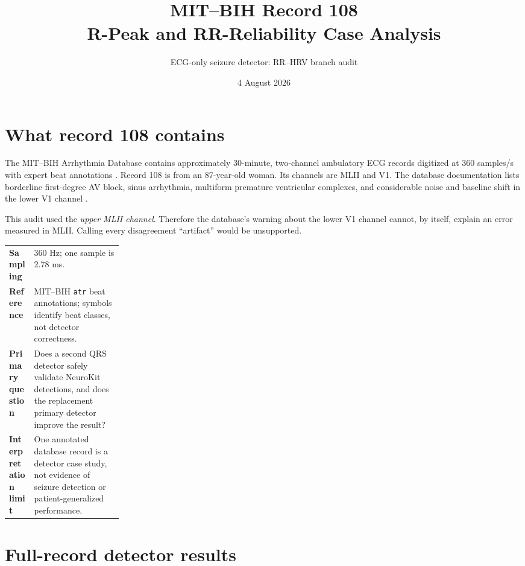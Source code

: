 \documentclass[10pt]{article}
\title{MIT--BIH Record 108\\R-Peak and RR-Reliability Case Analysis}
\author{ECG-only seizure detector: RR--HRV branch audit}
\date{4 August 2026}
\begin{document}
\maketitle


\section{What record 108 contains}
The MIT--BIH Arrhythmia Database contains approximately 30-minute, two-channel ambulatory ECG records digitized at 360 samples/s with expert beat annotations \cite{moody2001mitbih,physionetmitdb,goldberger2000physiobank}. Record 108 is from an 87-year-old woman. Its channels are MLII and V1. The database documentation lists borderline first-degree AV block, sinus arrhythmia, multiform premature ventricular complexes, and considerable noise and baseline shift in the lower V1 channel \cite{physionetmitdb}.

This audit used the \emph{upper MLII channel}. Therefore the database's warning about the lower V1 channel cannot, by itself, explain an error measured in MLII. Calling every disagreement ``artifact'' would be unsupported.

\begin{tabularx}{\linewidth}{@{}>{\bfseries}p{0.22\linewidth}X@{}}
Sampling & 360 Hz; one sample is 2.78 ms.\\
Reference & MIT--BIH \texttt{atr} beat annotations; symbols identify beat classes, not detector correctness.\\
Primary question & Does a second QRS detector safely validate NeuroKit detections, and does the replacement primary detector improve the result?\\
Interpretation limit & One annotated database record is a detector case study, not evidence of seizure detection or patient-generalized performance.\\
\end{tabularx}

\section{Full-record detector results}
\metricdef\ \provenance
\end{document}
